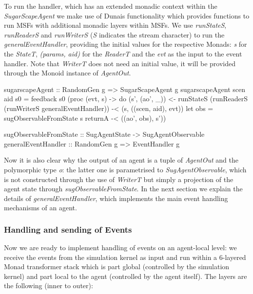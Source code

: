 To run the handler, which has an extended monadic context within the \textit{SugarScapeAgent} we make use of Dunais functionality which provides functions to run MSFs with additional monadic layers within MSFs. We use \textit{runStateS}, \textit{runReaderS} and \textit{runWriterS} (\textit{S} indicates the stream character) to run the \textit{generalEventHandler}, providing the initial values for the respective Monads: \textit{s} for the \textit{StateT}, \textit{(params, aid)} for the \textit{ReaderT} and the \textit{evt} as the input to the event handler. Note that \textit{WriterT} does not need an initial value, it will be provided through the Monoid instance of \textit{AgentOut}.

\begin{HaskellCode}
sugarscapeAgent :: RandomGen g => SugarScapeAgent g
sugarscapeAgent scen aid s0 = feedback s0 (proc (evt, s) -> do
  (s', (ao', _)) <- runStateS 
                      (runReaderS 
                        (runWriterS generalEventHandler)) -< (s, ((scen, aid), evt))
  let obs = sugObservableFromState s
  returnA -< ((ao', obs), s'))

sugObservableFromState :: SugAgentState -> SugAgentObservable
generalEventHandler :: RandomGen g => EventHandler g
\end{HaskellCode}

Now it is also clear why the output of an agent is a tuple of \textit{AgentOut} and the polymorphic type \textit{o}: the latter one is parametrised to \textit{SugAgentObservable}, which is not constructed through the use of \textit{WriterT} but simply a projection of the agent state through \textit{sugObservableFromState}. In the next section we explain the details of \textit{generalEventHandler}, which implements the main event handling mechanisms of an agent.

\subsubsection{Handling and sending of Events}
Now we are ready to implement handling of events on an agent-local level: we receive the events from the simulation kernel as input and run within a 6-layered Monad transformer stack which is part global (controlled by the simulation kernel) and part local to the agent (controlled by the agent itself). The layers are the following (inner to outer):

